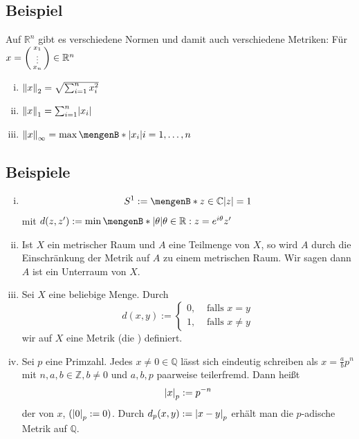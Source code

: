 \subsection[Beispiel: Normen auf $\mathds{R}^n$]{Beispiel} %
\label{sub:13}
Auf $\mathds{R}^n$ gibt es verschiedene Normen und damit auch verschiedene Metriken: Für $x= \begin{psmallmatrix}
	x_1 \\ \vdots \\ x_n
\end{psmallmatrix} \in \mathds{R}^n$
\begin{enumerate}[(i)]
	\item $\norm[2]{x} = \sqrt{\sum_{i=1}^{n} x_i^2}  $
	\item $\norm[1]{x}  = \sum_{i=1}^{n} \abs{x_i} $
	\item $\norm[\infty]{x} = \max \set[\abs{x_i} ]{i=1, \ldots , n}  $
\end{enumerate}

\subsection[Beispiele für Metriken]{Beispiele} %
\label{sub:14}
\begin{enumerate}[(i)]
	\item \[
		S^1 := \set[z \in \mathds{C}]{\abs*{z} = 1 } 
	\]
	mit $d(z,z') := \min \set[\abs*{\theta} ]{\theta \in \mathds{R} : z = e^{i \theta} z'} $
	\item Ist $X$ ein metrischer Raum und $A$ eine Teilmenge von $X$, so wird $A$ durch die Einschränkung der Metrik auf $A$ zu einem metrischen Raum. Wir sagen dann $A$ ist 
	ein Unterraum von $X$.
	\item Sei $X$ eine beliebige Menge. Durch
	\[
		d(x,y) := \begin{cases}
			0, &\text{ falls } x=y\\
			1, &\text{ falls } x \not= y
		\end{cases}
	\]
	wir auf $X$ eine Metrik (die ) definiert.
	\item Sei $p$ eine Primzahl. Jedes $x \not= 0 \in \mathds{Q}$ lässt sich eindeutig schreiben als $x = \frac{a}{b} p^n$ mit $n,a,b \in \mathds{Z}, b \not= 0$ und $a,b,p$
	paarweise teilerfremd. Dann heißt
	\[
		\abs*{x}_p := p^{-n} 
	\]
	der  von $x$, $(\abs*{0}_p := 0 )$. Durch $d_p(x,y) := \abs*{x-y}_p $ erhält man die $p$-adische
	 Metrik auf $\mathds{Q}$. 
\end{enumerate}

